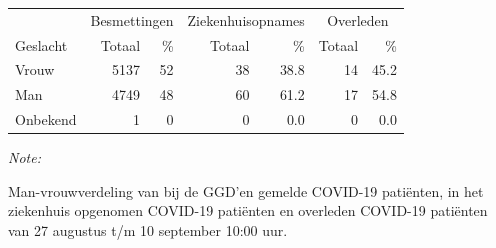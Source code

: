\documentclass[
  english,
  man,floatsintext]{apa6}
\begin{document}
\begin{table}[H]
\centering\begingroup\fontsize{11}{13}\selectfont

\begin{threeparttable}
\begin{tabular}{lrrrrrr}
\toprule
\multicolumn{1}{c}{ } & \multicolumn{2}{c}{Besmettingen} & \multicolumn{2}{c}{Ziekenhuisopnames} & \multicolumn{2}{c}{Overleden} \\
\cmidrule(l{3pt}r{3pt}){2-3} \cmidrule(l{3pt}r{3pt}){4-5} \cmidrule(l{3pt}r{3pt}){6-7}
Geslacht & Totaal & \% & Totaal & \% & Totaal & \%\\
\midrule
Vrouw & 5137 & 52 & 38 & 38.8 & 14 & 45.2\\
Man & 4749 & 48 & 60 & 61.2 & 17 & 54.8\\
Onbekend & 1 & 0 & 0 & 0.0 & 0 & 0.0\\
\bottomrule
\end{tabular}
\begin{tablenotes}
\item \textit{Note: } 
\item Man-vrouwverdeling van bij de GGD’en gemelde COVID-19 patiënten, in het ziekenhuis opgenomen COVID-19 patiënten en overleden COVID-19 patiënten van 27 augustus t/m 10 september 10:00 uur.
\end{tablenotes}
\end{threeparttable}
\endgroup{}
\end{table}
\newpage
\end{document}
